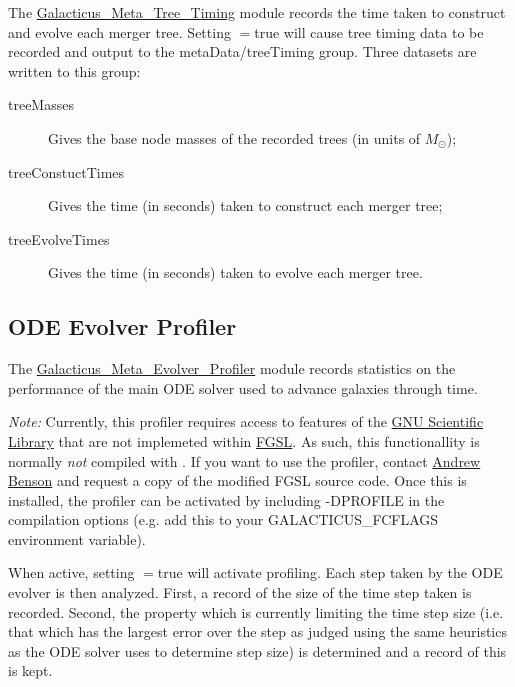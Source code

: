 The \hyperlink{galacticus.meta.tree_timing.F90:galacticus_meta_tree_timing}{{\normalfont \ttfamily Galacticus\_Meta\_Tree\_Timing}} module records the time taken to construct and evolve each merger tree. Setting {\normalfont \ttfamily [metaCollectTimingData]}$=${\normalfont \ttfamily true} will cause tree timing data to be recorded and output to the {\normalfont \ttfamily metaData/treeTiming} group. Three datasets are written to this group:
\begin{description}
 \item[{\normalfont \ttfamily treeMasses}] Gives the base node masses of the recorded trees (in units of $M_\odot$);
 \item[{\normalfont \ttfamily treeConstuctTimes}] Gives the time (in seconds) taken to construct each merger tree;
 \item[{\normalfont \ttfamily treeEvolveTimes}] Gives the time (in seconds) taken to evolve each merger tree.
\end{description}

\subsection{ODE Evolver Profiler}

The \hyperlink{galacticus.meta.evolver_profiler.F90:galacticus_meta_evolver_profiler}{{\normalfont \ttfamily Galacticus\_Meta\_Evolver\_Profiler}} module records statistics on the performance of the main ODE solver used to advance galaxies through time. 

\emph{Note:} Currently, this profiler requires access to features of the \href{http://www.gnu.org/software/gsl/}{GNU Scientific Library} that are not implemeted within \href{http://www.lrz-muenchen.de/services/software/mathematik/gsl/fortran/}{FGSL}. As such, this functionallity is normally \emph{not} compiled with \glc. If you want to use the profiler, contact \href{mailto:abenson@carnegiescience.edu}{Andrew Benson} and request a copy of the modified FGSL source code. Once this is installed, the profiler can be activated by including {\normalfont \ttfamily -DPROFILE} in the compilation options (e.g. add this to your {\normalfont \ttfamily GALACTICUS\_FCFLAGS} environment variable).

When active, setting {\normalfont \ttfamily [profileOdeEvolver]}$=${\normalfont \ttfamily true} will activate profiling. Each step taken by the ODE evolver is then analyzed. First, a record of the size of the time step taken is recorded. Second, the property which is currently limiting the time step size (i.e. that which has the largest error over the step as judged using the same heuristics as the ODE solver uses to determine step size) is determined and a record of this is kept.

